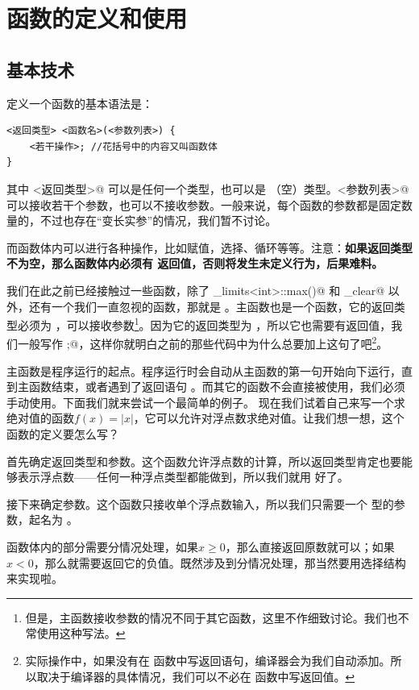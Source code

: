 \section{函数的定义和使用}
\subsection*{基本技术}
定义一个函数的基本语法是：
\begin{lstlisting}
<返回类型> <函数名>(<参数列表>) {
    <若干操作>; //花括号中的内容又叫函数体
}
\end{lstlisting}
其中 \lstinline@<返回类型>@ 可以是任何一个类型，也可以是 \lstinline@void@（空）类型。\lstinline@<参数列表>@ 可以接收若干个参数，也可以不接收参数。一般来说，每个函数的参数都是固定数量的，不过也存在``变长实参''的情况，我们暂不讨论。\par
而函数体内可以进行各种操作，比如赋值，选择、循环等等。注意：\textbf{如果返回类型不为空，那么函数体内必须有 \lstinline@return@ 返回值，否则将发生未定义行为，后果难料。}\par
我们在此之前已经接触过一些函数，除了 \lstinline@numeric_limits<int>::max()@ 和 \lstinline@input_clear@ 以外，还有一个我们一直忽视的函数，那就是 \lstinline@main@。主函数也是一个函数，它的返回类型必须为 \lstinline@int@，可以接收参数\footnote{但是，主函数接收参数的情况不同于其它函数，这里不作细致讨论。我们也不常使用这种写法。}。因为它的返回类型为 \lstinline@int@，所以它也需要有返回值，我们一般写作 ;@，这样你就明白之前的那些代码中为什么总要加上这句了吧\footnote{实际操作中，如果没有在 \lstinline@main@ 函数中写返回语句，编译器会为我们自动添加。所以取决于编译器的具体情况，我们可以不必在 \lstinline@main@ 函数中写返回值。}。\par
主函数是程序运行的起点。程序运行时会自动从主函数的第一句开始向下运行，直到主函数结束，或者遇到了返回语句 \lstinline@return@。而其它的函数不会直接被使用，我们必须手动使用。下面我们就来尝试一个最简单的例子。
现在我们试着自己来写一个求绝对值的函数$f(x)=\left|x\right|$，它可以允许对浮点数求绝对值。让我们想一想，这个函数的定义要怎么写？\par
首先确定返回类型和参数。这个函数允许浮点数的计算，所以返回类型肯定也要能够表示浮点数——任何一种浮点类型都能做到，所以我们就用 \lstinline@double@ 好了。\par
接下来确定参数。这个函数只接收单个浮点数输入，所以我们只需要一个 \lstinline@double@ 型的参数，起名为 \lstinline@x@。\par
函数体内的部分需要分情况处理，如果$x\ge0$，那么直接返回原数就可以；如果$x<0$，那么就需要返回它的负值。既然涉及到分情况处理，那当然要用选择结构来实现啦。
